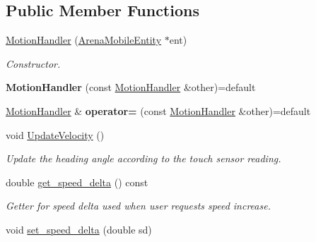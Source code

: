 \subsection*{Public Member Functions}
\begin{DoxyCompactItemize}
\item 
\hyperlink{classMotionHandler_a48c0070bfda6acb8a7493eb7fe1200c4}{Motion\+Handler} (\hyperlink{classArenaMobileEntity}{Arena\+Mobile\+Entity} $\ast$ent)\hypertarget{classMotionHandler_a48c0070bfda6acb8a7493eb7fe1200c4}{}\label{classMotionHandler_a48c0070bfda6acb8a7493eb7fe1200c4}

\begin{DoxyCompactList}\small\item\em Constructor. \end{DoxyCompactList}\item 
{\bfseries Motion\+Handler} (const \hyperlink{classMotionHandler}{Motion\+Handler} \&other)=default\hypertarget{classMotionHandler_a91dc98beab9d5ccce6b6c18ce32c0488}{}\label{classMotionHandler_a91dc98beab9d5ccce6b6c18ce32c0488}

\item 
\hyperlink{classMotionHandler}{Motion\+Handler} \& {\bfseries operator=} (const \hyperlink{classMotionHandler}{Motion\+Handler} \&other)=default\hypertarget{classMotionHandler_ad45188f2d9794fd2b257d586a7b522e6}{}\label{classMotionHandler_ad45188f2d9794fd2b257d586a7b522e6}

\item 
void \hyperlink{classMotionHandler_a44b092d9627f25f57c50ec8886d0bc29}{Update\+Velocity} ()\hypertarget{classMotionHandler_a44b092d9627f25f57c50ec8886d0bc29}{}\label{classMotionHandler_a44b092d9627f25f57c50ec8886d0bc29}

\begin{DoxyCompactList}\small\item\em Update the heading angle according to the touch sensor reading. \end{DoxyCompactList}\item 
double \hyperlink{classMotionHandler_a7a9b503e3da267c7af25d58daff5f216}{get\+\_\+speed\+\_\+delta} () const \hypertarget{classMotionHandler_a7a9b503e3da267c7af25d58daff5f216}{}\label{classMotionHandler_a7a9b503e3da267c7af25d58daff5f216}

\begin{DoxyCompactList}\small\item\em Getter for speed delta used when user requests speed increase. \end{DoxyCompactList}\item 
void \hyperlink{classMotionHandler_a908b330346b3fe969684106bd5c7619d}{set\+\_\+speed\+\_\+delta} (double sd)\hypertarget{classMotionHandler_a908b330346b3fe969684106bd5c7619d}{}\label{classMotionHandler_a908b330346b3fe969684106bd5c7619d}


\end{DoxyCompactItemize}
